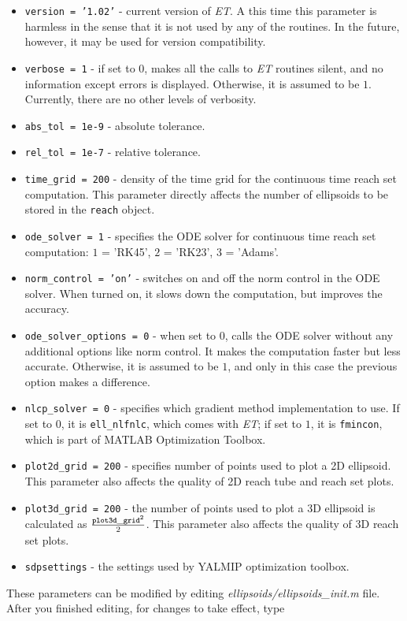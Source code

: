 \begin{itemize}
\item {\tt version = '1.02'} - current version of {\it ET}. A this time
this parameter is harmless in the sense that it is not used by any of the
routines. In the future, however, it may be used for version compatibility.
\item {\tt verbose = 1} - if set to $0$, makes all the calls to {\it ET}
routines silent, and no information except errors is displayed. Otherwise,
it is assumed to be $1$. Currently, there are no other levels of verbosity.
\item {\tt abs\_tol = 1e-9} - absolute tolerance.
\item {\tt rel\_tol = 1e-7} - relative tolerance.
\item {\tt time\_grid = 200} - density of the time grid for the
continuous time reach set computation.
This parameter directly affects the number of ellipsoids to
be stored in the {\tt reach} object.
\item {\tt ode\_solver = 1} - specifies the ODE solver for continuous time
reach set computation: $1$ = 'RK45', $2$ = 'RK23', $3$ = 'Adams'.
\item {\tt norm\_control = 'on'} - switches on and off the norm control
in the ODE solver. When turned on, it slows down the computation, but improves
the accuracy.
\item {\tt ode\_solver\_options = 0} - when set to $0$, calls the ODE solver
without any additional options like norm control. It makes the computation
faster but less accurate. Otherwise, it is assumed to be $1$, and only in this
case the previous option makes a difference.
\item {\tt nlcp\_solver = 0} - specifies which gradient method implementation
to use. If set to $0$, it is {\tt ell\_nlfnlc}, which comes with {\it ET};
if set to $1$, it is {\tt fmincon}, which is part of MATLAB Optimization Toolbox.
\item {\tt plot2d\_grid = 200} - specifies number of points used to plot a
2D ellipsoid. This parameter also affects the quality of 2D reach tube
and reach set plots.
\item {\tt plot3d\_grid = 200} - the number of points used to plot
a 3D ellipsoid is calculated as $\frac{{\tt plot3d\_grid}^2}{2}$.
This parameter also affects the quality of 3D reach set plots.
\item {\tt sdpsettings} - the settings used by YALMIP optimization toolbox.
\end{itemize}
These parameters can be modified by editing {\it ellipsoids/ellipsoids\_init.m}
file. After you finished editing, for changes to take effect, type

